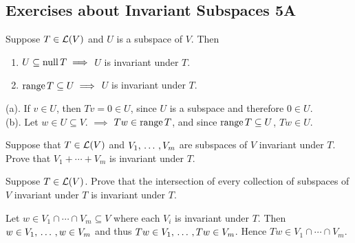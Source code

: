 \subsection*{Exercises about Invariant Subspaces 5A}

\begin{xrcs}
  Suppose $T \in \mathcal{L}(V)$ and $U$ is a subspace of $V$. Then
  \begin{enumerate}
    \item $U \subseteq \operatorname{null} T \implies$ $U$ is invariant under $T$.
    \item $\operatorname{range} T \subseteq U \implies$ $U$ is invariant under $T$.
  \end{enumerate}

  \begin{prf}
    { }(a). { }If $v \in U$, then $Tv = 0 \in U$, since $U$ is a subspace and therefore $0 \in U$. \\
    (b). { }Let $w \in U\subseteq V$. $\implies$ $Tw \in \operatorname{range} T$, and since $\operatorname{range} T \subseteq U$, $Tw \in U$.
  \end{prf}

\end{xrcs}


\begin{xrcs}
  Suppose that $T \in \mathcal{L} (V)$ and $V_1, {\, \ldots \,\,}, V_m$ are subspaces of $V$ invariant under $T$. \\
  Prove that $V_1 + \cdots + V_m$ is invariant under $T$.

\end{xrcs}


\begin{xrcs}
  Suppose $T \in \mathcal{L}(V)$. Prove that the intersection of every collection of subspaces of $V$ invariant under $T$ is invariant under $T$.

  \begin{prf}
    Let $w \in V_1 \cap \cdots \cap V_m \subseteq V$ where each $V_i$ is invariant under $T$. Then $w \in V_1, {\, \ldots \,\,}, w \in V_m$ and thus $Tw \in V_1, {\, \ldots \,\,}, Tw \in V_m$. Hence $Tw \in V_1 \cap \cdots \cap V_m$.
  \end{prf}
\end{xrcs}
